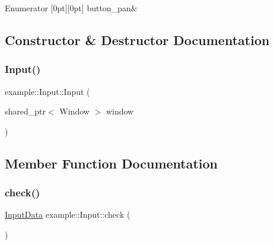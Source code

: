 \begin{DoxyEnumFields}{Enumerator}
[0pt][0pt]{}\mbox{\label{classexample_1_1_input_a315efe66cfd6b49cbe0f46ab46ece59fae744adfc1878946c23375555ec240cc3}} 
button\+\_\+pan&\\
\hline

\end{DoxyEnumFields}


\subsection{Constructor \& Destructor Documentation}
\mbox{\label{classexample_1_1_input_a7784c5ddeff5d467d26daef96cd4a303}} 
\subsubsection{\texorpdfstring{Input()}{Input()}}
{\footnotesize\ttfamily example\+::\+Input\+::\+Input (\begin{DoxyParamCaption}\item[{shared\+\_\+ptr$<$ Window $>$}]{window }\end{DoxyParamCaption})\hspace{0.3cm}{\ttfamily [inline]}}



\subsection{Member Function Documentation}
\mbox{\label{classexample_1_1_input_a0a4492b08db16e638a4cd7bcf56a70ed}} 
\subsubsection{\texorpdfstring{check()}{check()}}
{\footnotesize\ttfamily \mbox{\hyperlink{classexample_1_1_input_af6bf4fd763ca01bd106ca3b03f162e3d}{Input\+Data}} example\+::\+Input\+::check (\begin{DoxyParamCaption}{ }\end{DoxyParamCaption})\hspace{0.3cm}{\ttfamily [inline]}}

